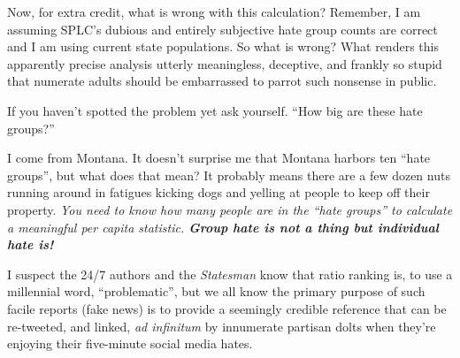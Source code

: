 Now, for extra credit, what is wrong with this calculation? Remember, I
am assuming SPLC's dubious and entirely subjective hate group counts are
correct and I am using current state populations. So what is wrong? What
renders this apparently precise analysis utterly meaningless, deceptive,
and frankly so stupid that numerate adults should be embarrassed to
parrot such nonsense in public.

If you haven't spotted the problem yet ask yourself. ``How big are these
hate groups?''

I come from Montana. It doesn't surprise me that Montana harbors ten
``hate groups'', but what does that mean? It probably means there are a
few dozen nuts running around in fatigues kicking dogs and yelling at
people to keep off their property. \emph{You need to know how many
people are in the ``hate groups'' to calculate a meaningful per capita
statistic. \textbf{Group hate is not a thing but individual hate is!}}

I suspect the 24/7 authors and the \textit{Statesman} know that ratio ranking is,
to use a millennial word, ``problematic'', but we all know the primary
purpose of such facile reports (fake news) is to provide a seemingly
credible reference that can be re-tweeted, and linked, \emph{ad
infinitum} by innumerate partisan dolts when they're enjoying their
five-minute social media hates.



%
 
 
 
